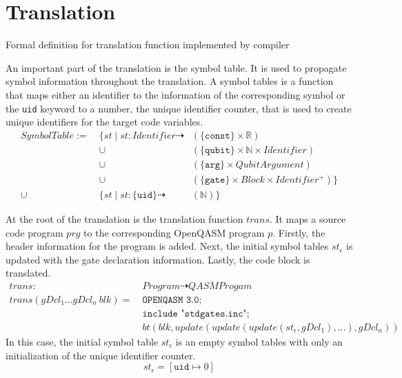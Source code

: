 \section{Translation}
\label{sec:concept_translation}
Formal definition for translation function implemented by compiler

An important part of the translation is the symbol table. It is used to propagate symbol information throughout the translation. A symbol tables is a function that maps either an identifier to the information of the corresponding symbol or the \texttt{uid} keyword to a number, the unique identifier counter, that is used to create unique identifiers for the target code variables.
\begin{align*}
    SymbolTable := \ & \{st \mid st : Identifier \dashrightarrow & (\{\texttt{const}\} \times \mathbb{R})\\
    & \cup& (\{\texttt{qubit}\} \times \mathbb{N} \times Identifier)\\
    & \cup& (\{\texttt{arg}\} \times QubitArgument)\\
    & \cup& (\{\texttt{gate}\} \times Block \times Identifier^+)
    \} \\
   \cup \ & \{st \mid st : \{\texttt{uid}\} \dashrightarrow & (\mathbb{N})\}
\end{align*}

At the root of the translation is the translation function $trans$. It maps a source code program $prg$ to the corresponding OpenQASM program $p$. Firstly, the header information for the program is added. Next, the initial symbol tables $st_\epsilon$ is updated with the gate declaration information. Lastly, the code block is translated. 
\begin{align*}
    trans : \ & Program \dashrightarrow QASMProgam\\
    trans(gDcl_1 \dots gDcl_n \ blk) = \ & \texttt{OPENQASM 3.0;}\\
                & \texttt{include "stdgates.inc";}\\
                & bt(blk, update(update(update(st_\epsilon, gDcl_1), ...), gDcl_n))
\end{align*}  
In this case, the initial symbol table $st_\epsilon$ is an empty symbol tables with only an initialization of the unique identifier counter. 
\begin{equation*}
    st_\epsilon = [ \texttt{uid} \mapsto 0 ]
\end{equation*}


